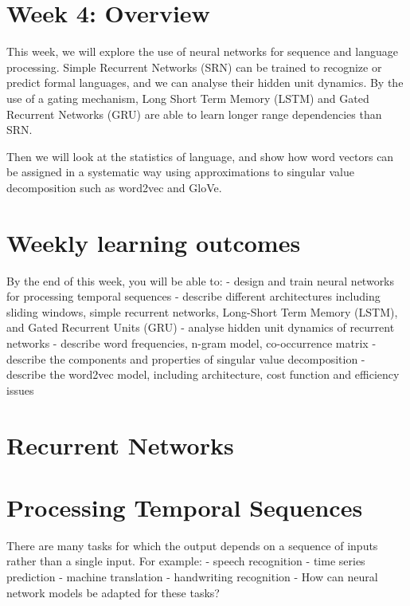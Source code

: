 \documentclass[11pt]{article}
\begin{document}
\section{Week 4: Overview}\label{sec:week-4:-overview}

    This week, we will explore the use of neural networks for sequence and
    language processing.
Simple Recurrent Networks (SRN) can be trained to recognize or predict formal
languages, and we can analyse their hidden unit dynamics.
By the use of a gating mechanism, Long Short Term Memory (LSTM) and Gated
Recurrent Networks (GRU) are able to learn longer range dependencies than SRN.

Then we will look at the statistics of language, and show how word vectors can
be assigned in a systematic way using approximations to singular value
decomposition such as word2vec and GloVe.

\section{Weekly learning outcomes}\label{sec:weekly-learning-outcomes}
By the end of this week, you will be able to:
- design and train neural networks for processing temporal sequences
- describe different architectures including sliding windows, simple recurrent networks, Long-Short Term Memory (LSTM), and Gated Recurrent Units (GRU)
- analyse hidden unit dynamics of recurrent networks
- describe word frequencies, n-gram model, co-occurrence matrix
- describe the components and properties of singular value decomposition
- describe the word2vec model, including architecture, cost function and efficiency issues

\section{Recurrent Networks}\label{sec:recurrent-networks}


\section{Processing Temporal Sequences}\label{sec:processing-temporal-sequences}
There are many tasks for which the output depends on a sequence of inputs rather than a single input.
For example:
- speech recognition
- time series prediction
- machine translation
- handwriting recognition
- How can neural network models be adapted for these tasks?
\end{document}
